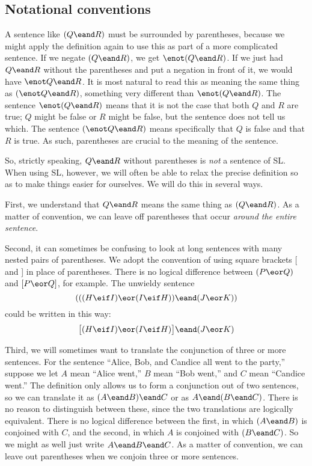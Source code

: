 \subsection{Notational conventions}
\label{SLconventions}
A sentence like $(Q \eand R)$ must be surrounded by parentheses, because we might apply the definition again to use this as part of a more complicated sentence. If we negate $(Q \eand R)$, we get $\enot(Q \eand R)$. If we just had $Q \eand R$ without the parentheses and put a negation in front of it, we would have $\enot Q \eand R$. It is most natural to read this as meaning the same thing as $(\enot Q \eand R)$, something very different than $\enot(Q\eand R)$. The sentence $\enot(Q \eand R)$ means that it is not the case that both $Q$ and $R$ are true; $Q$ might be false or $R$ might be false, but the sentence does not tell us which. The sentence $(\enot Q \eand R)$ means specifically that $Q$ is false and that $R$ is true. As such, parentheses are crucial to the meaning of the sentence.

So, strictly speaking, $Q \eand R$ without parentheses is \emph{not} a sentence of SL. When using SL, however, we will often be able to relax the precise definition so as to make things easier for ourselves. We will do this in several ways.

First,  we understand that $Q \eand R$ means the same thing as $(Q \eand R)$. As a matter of convention, we can leave off parentheses that occur \emph{around the entire sentence}.

Second, it can sometimes be confusing to look at long sentences with many nested pairs of parentheses. We adopt the convention of using square brackets [ and ] in place of parentheses. There is no logical difference between $(P\eor Q)$ and $[P\eor Q]$, for example. The unwieldy sentence
$$(((H \eif I) \eor (I \eif H)) \eand (J \eor K))$$
could be written in this way:
$$\bigl[(H \eif I) \eor (I \eif H)\bigr] \eand (J \eor K)$$


Third, we will sometimes want to translate the conjunction of three or more sentences. For the sentence ``Alice, Bob, and Candice all went to the party,'' suppose we let $A$ mean ``Alice went,'' $B$ mean ``Bob went,'' and $C$ mean ``Candice went.'' The definition only allows us to form a conjunction out of two sentences, so we can translate it as $(A \eand B) \eand C$ or as $A \eand (B \eand C)$. There is no reason to distinguish between these, since the two translations are logically equivalent. There is no logical difference between the first, in which $(A \eand B)$ is conjoined with $C$, and the second, in which $A$ is conjoined with $(B \eand C)$.  So we might as well just write $A \eand B \eand C$. As a matter of convention, we can leave out parentheses when we conjoin three or more sentences.

